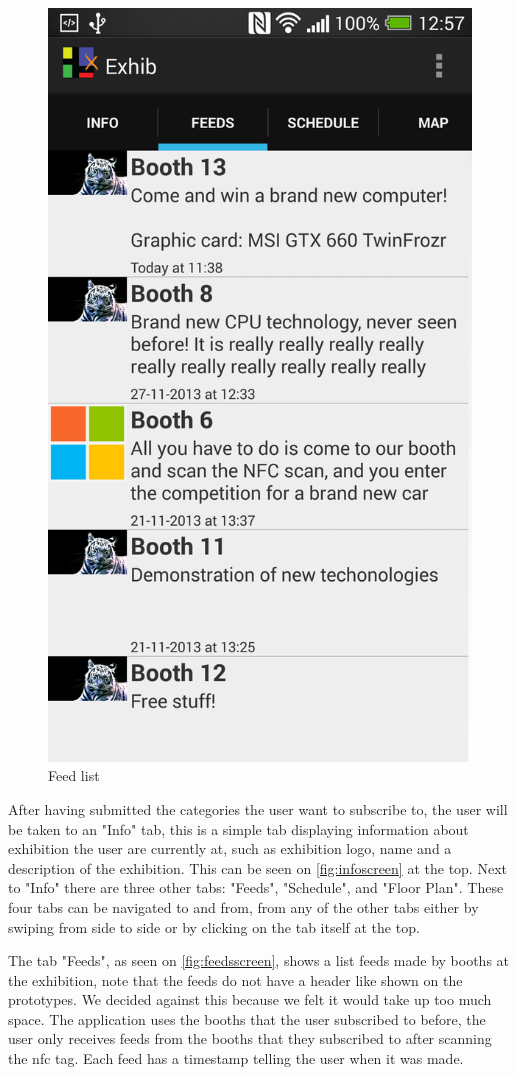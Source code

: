 \begin{figure}[H]
\begin{minipage}[b]{0.5\columnwidth}
\includegraphics[width=0.7\columnwidth]{img/finaldesign/feedsscreen.png}
\caption{Feed list} 
\label{fig:feedsscreen}
\end{minipage}
\end{figure}

After having submitted the categories the user want to subscribe to, the user will be taken to an "Info" tab, this is a simple tab displaying information about exhibition the user are currently at, such as exhibition logo, name and a description of the exhibition. This can be seen on \autoref{fig:infoscreen}  at the top. Next to "Info" there are three other tabs: "Feeds", "Schedule", and "Floor Plan". These four tabs can be navigated to and from, from any of the other tabs either by swiping from side to side or by clicking on the tab itself at the top.

The tab "Feeds", as seen on \autoref{fig:feedsscreen}, shows a list feeds made by booths at the exhibition, note that the feeds do not have a header like shown on the prototypes. We decided against this because we felt it would take up too much space. The application uses the booths that the user subscribed to before, the user only receives feeds from the booths that they subscribed to after scanning the \ac{nfc} tag. Each feed has a timestamp telling the user when it was made.

